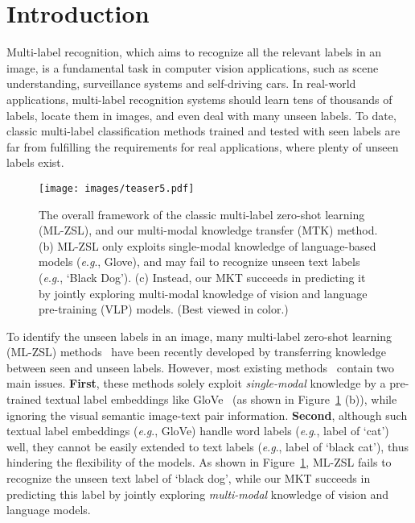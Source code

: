 \documentclass[letterpaper]{article} \usepackage{aaai23}  \usepackage{times}  \usepackage{helvet}  \usepackage{courier}  \usepackage[hyphens]{url}  \usepackage{graphicx} \urlstyle{rm} \def\UrlFont{\rm}  \usepackage{natbib}  \usepackage{caption} \frenchspacing  \setlength{\pdfpagewidth}{8.5in}  \setlength{\pdfpageheight}{11in}
\newcommand{\eg}{\textit{e}.\textit{g}.}
\begin{document}
\section{Introduction}
Multi-label recognition, which aims to recognize all the relevant labels in an image, is a fundamental task in computer vision applications, such as scene understanding, surveillance systems and self-driving cars.
In real-world applications, multi-label recognition systems should learn tens of thousands of labels, locate them in images, and even deal with many unseen labels.
To date, classic multi-label classification methods trained and tested with seen labels are far from fulfilling the requirements for real applications, where plenty of unseen labels exist.
\par
\begin{figure}[t]
\centering
\texttt{[image: images/teaser5.pdf]}
\caption{The overall framework of the classic multi-label zero-shot learning (ML-ZSL), and our multi-modal knowledge transfer (MTK) method. (b) ML-ZSL only exploits single-modal knowledge of language-based models (\eg, Glove), and may fail to recognize unseen text labels (\eg, `Black Dog'). (c) Instead, our MKT  succeeds in predicting it by jointly exploring multi-modal knowledge of vision and language pre-training (VLP) models. (Best viewed in color.)
}
\label{fig:intro}
\end{figure}

To identify the unseen labels in an image,
many multi-label zero-shot learning (ML-ZSL) methods~\cite{lesa, ganmlzsl, zssdl, biam} have been recently developed by transferring  knowledge between  seen and unseen labels.
However, most existing  methods~\cite{fast0tag,lesa,ganmlzsl,zssdl,biam} 
contain two main issues. 
\textbf{First},  these methods solely exploit \textit{single-modal} knowledge by a pre-trained textual label embeddings like GloVe~\cite{glove} (as shown in Figure~\ref{fig:intro} (b)),
while ignoring the visual semantic image-text pair information.
 \textbf{Second}, although such textual label embeddings  (\eg, GloVe) handle  word labels (\eg, label of `cat') well,  they cannot be easily  extended to text labels (\eg, label of `black cat'), thus hindering the flexibility of the models. 
As shown in Figure~\ref{fig:intro}, ML-ZSL fails to recognize the unseen text label of `black dog', while our MKT succeeds in predicting this label by jointly exploring \textit{multi-modal} knowledge of vision and language models.
\end{document}
